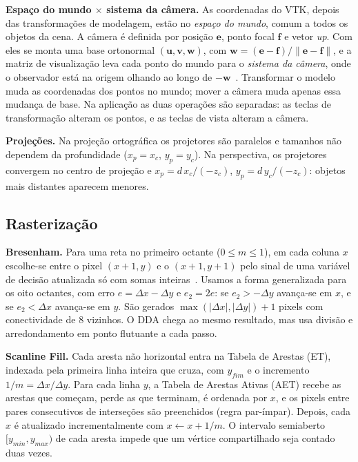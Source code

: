 \documentclass[11pt, a4paper]{article}
\begin{document}
\textbf{Espaço do mundo $\times$ sistema da câmera.} As coordenadas do VTK, depois das transformações de modelagem, estão no \emph{espaço do mundo}, comum a todos os objetos da cena. A câmera é definida por posição $\mathbf{e}$, ponto focal $\mathbf{f}$ e vetor \emph{up}. Com eles se monta uma base ortonormal $(\mathbf{u},\mathbf{v},\mathbf{w})$, com $\mathbf{w}=(\mathbf{e}-\mathbf{f})/\|\mathbf{e}-\mathbf{f}\|$, e a matriz de visualização leva cada ponto do mundo para o \emph{sistema da câmera}, onde o observador está na origem olhando ao longo de $-\mathbf{w}$~\cite{angel}. Transformar o modelo muda as coordenadas dos pontos no mundo; mover a câmera muda apenas essa mudança de base. Na aplicação as duas operações são separadas: as teclas de transformação alteram os pontos, e as teclas de vista alteram a câmera.

\textbf{Projeções.} Na projeção ortográfica os projetores são paralelos e tamanhos não dependem da profundidade ($x_p=x_c$, $y_p=y_c$). Na perspectiva, os projetores convergem no centro de projeção e $x_p = d\,x_c/(-z_c)$, $y_p = d\,y_c/(-z_c)$: objetos mais distantes aparecem menores.

\subsection{Rasterização}
\textbf{Bresenham.} Para uma reta no primeiro octante ($0\le m\le1$), em cada coluna $x$ escolhe-se entre o pixel $(x+1,y)$ e o $(x+1,y+1)$ pelo sinal de uma variável de decisão atualizada só com somas inteiras~\cite{bresenham1965}. Usamos a forma generalizada para os oito octantes, com erro $e = \Delta x - \Delta y$ e $e_2 = 2e$: se $e_2 > -\Delta y$ avança-se em $x$, e se $e_2 < \Delta x$ avança-se em $y$. São gerados $\max(|\Delta x|,|\Delta y|)+1$ pixels com conectividade de 8 vizinhos. O DDA chega ao mesmo resultado, mas usa divisão e arredondamento em ponto flutuante a cada passo.

\textbf{Scanline Fill.} Cada aresta não horizontal entra na Tabela de Arestas (ET), indexada pela primeira linha inteira que cruza, com $y_{fim}$ e o incremento $1/m=\Delta x/\Delta y$. Para cada linha $y$, a Tabela de Arestas Ativas (AET) recebe as arestas que começam, perde as que terminam, é ordenada por $x$, e os pixels entre pares consecutivos de interseções são preenchidos (regra par-ímpar). Depois, cada $x$ é atualizado incrementalmente com $x \leftarrow x + 1/m$. O intervalo semiaberto $[y_{min}, y_{max})$ de cada aresta impede que um vértice compartilhado seja contado duas vezes.
\end{document}
